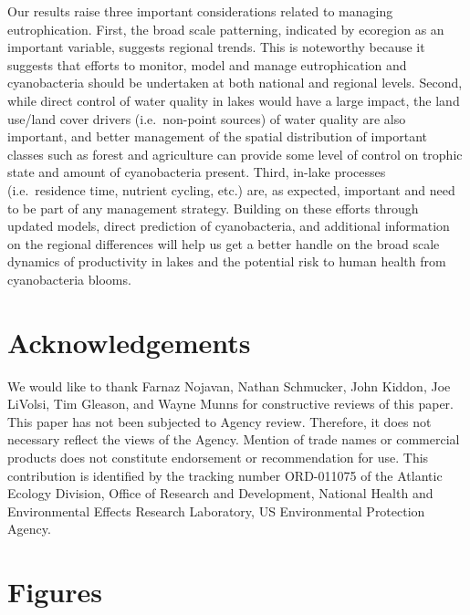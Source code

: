\documentclass[11pt,]{article}
\begin{document}
Our results raise three important considerations related to managing
eutrophication. First, the broad scale patterning, indicated by
ecoregion as an important variable, suggests regional trends. This is
noteworthy because it suggests that efforts to monitor, model and manage
eutrophication and cyanobacteria should be undertaken at both national
and regional levels. Second, while direct control of water quality in
lakes would have a large impact, the land use/land cover drivers
(i.e.~non-point sources) of water quality are also important, and better
management of the spatial distribution of important classes such as
forest and agriculture can provide some level of control on trophic
state and amount of cyanobacteria present. Third, in-lake processes
(i.e.~residence time, nutrient cycling, etc.) are, as expected,
important and need to be part of any management strategy. Building on
these efforts through updated models, direct prediction of
cyanobacteria, and additional information on the regional differences
will help us get a better handle on the broad scale dynamics of
productivity in lakes and the potential risk to human health from
cyanobacteria blooms.

\section{Acknowledgements}\label{acknowledgements}

We would like to thank Farnaz Nojavan, Nathan Schmucker, John Kiddon,
Joe LiVolsi, Tim Gleason, and Wayne Munns for constructive reviews of
this paper. This paper has not been subjected to Agency review.
Therefore, it does not necessary reflect the views of the Agency.
Mention of trade names or commercial products does not constitute
endorsement or recommendation for use. This contribution is identified
by the tracking number ORD-011075 of the Atlantic Ecology Division,
Office of Research and Development, National Health and Environmental
Effects Research Laboratory, US Environmental Protection Agency.

\newpage

\section{Figures}\label{figures}
\end{document}
